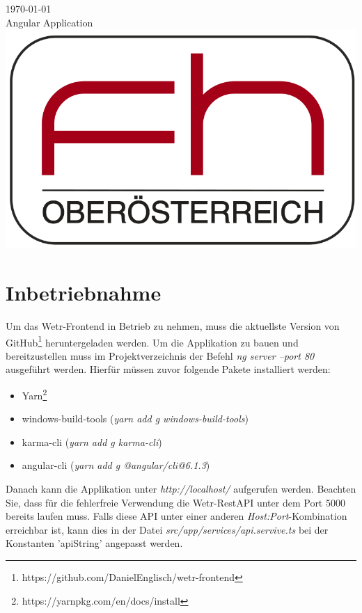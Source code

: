 \documentclass[12pt, letterpaper]{article}
\begin{document}
\begin{titlepage}
{\large \today}\\[1cm] 
{Angular Application}\\[2cm]


\includegraphics[scale=0.15]{img/logo.png}
 

\vfill 
\end{titlepage}


\tableofcontents
\newpage

\setlength\parindent{0pt}


\section{Inbetriebnahme}

Um das Wetr-Frontend in Betrieb zu nehmen, muss die aktuellste Version von GitHub\footnote{https://github.com/DanielEnglisch/wetr-frontend} heruntergeladen werden. Um die Applikation zu bauen und bereitzustellen muss im Projektverzeichnis der Befehl \textit{ng server --port 80} ausgeführt werden. Hierfür müssen zuvor folgende Pakete installiert werden:
\begin{itemize}
    \item Yarn\footnote{https://yarnpkg.com/en/docs/install}
    \item windows-build-tools (\textit{yarn add g windows-build-tools})
    \item karma-cli (\textit{yarn add g karma-cli})
    \item angular-cli (\textit{yarn add g @angular/cli@6.1.3})
\end{itemize}

Danach kann die Applikation unter \textit{http://localhost/} aufgerufen werden.
Beachten Sie, dass für die fehlerfreie Verwendung die Wetr-RestAPI unter dem Port $5000$ bereits laufen muss. Falls diese API unter einer anderen \textit{Host:Port}-Kombination erreichbar ist, kann dies in der Datei \textit{src/app/services/api.servive.ts} bei der Konstanten 'apiString' angepasst werden.
\newpage
\end{document}
